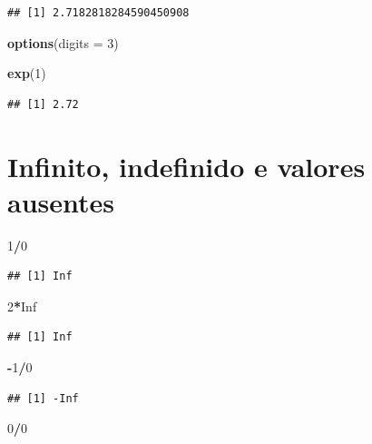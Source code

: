\documentclass[
]{book}
\newenvironment{Shaded}{\begin{snugshade}}{\end{snugshade}}
\newcommand{\AttributeTok}[1]{\textcolor[rgb]{0.13,0.29,0.53}{#1}}
\newcommand{\ConstantTok}[1]{\textcolor[rgb]{0.56,0.35,0.01}{#1}}
\newcommand{\DecValTok}[1]{\textcolor[rgb]{0.00,0.00,0.81}{#1}}
\newcommand{\FunctionTok}[1]{\textcolor[rgb]{0.13,0.29,0.53}{\textbf{#1}}}
\newcommand{\NormalTok}[1]{#1}
\newcommand{\SpecialCharTok}[1]{\textcolor[rgb]{0.81,0.36,0.00}{\textbf{#1}}}
\theoremstyle{definition}
\theoremstyle{definition}
\theoremstyle{definition}
\theoremstyle{definition}
\theoremstyle{remark}
\begin{document}
\begin{verbatim}
## [1] 2.7182818284590450908
\end{verbatim}

\begin{Shaded}
\begin{Highlighting}[]
\FunctionTok{options}\NormalTok{(}\AttributeTok{digits =} \DecValTok{3}\NormalTok{)}

\FunctionTok{exp}\NormalTok{(}\DecValTok{1}\NormalTok{)}
\end{Highlighting}
\end{Shaded}

\begin{verbatim}
## [1] 2.72
\end{verbatim}

\section{Infinito, indefinido e valores ausentes}\label{infinito-indefinido-e-valores-ausentes}

\begin{Shaded}
\begin{Highlighting}[]
\DecValTok{1}\SpecialCharTok{/}\DecValTok{0}  
\end{Highlighting}
\end{Shaded}

\begin{verbatim}
## [1] Inf
\end{verbatim}

\begin{Shaded}
\begin{Highlighting}[]
\DecValTok{2}\SpecialCharTok{*}\ConstantTok{Inf}
\end{Highlighting}
\end{Shaded}

\begin{verbatim}
## [1] Inf
\end{verbatim}

\begin{Shaded}
\begin{Highlighting}[]
\SpecialCharTok{{-}}\DecValTok{1}\SpecialCharTok{/}\DecValTok{0}
\end{Highlighting}
\end{Shaded}

\begin{verbatim}
## [1] -Inf
\end{verbatim}

\begin{Shaded}
\begin{Highlighting}[]
\DecValTok{0}\SpecialCharTok{/}\DecValTok{0}
\end{Highlighting}
\end{Shaded}
\end{document}
